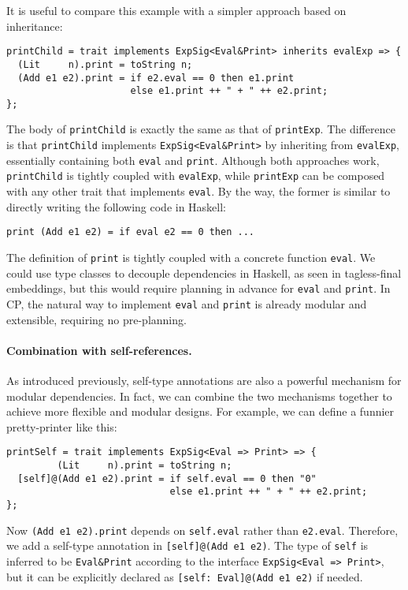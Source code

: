 It is useful to compare this example with a simpler approach based on
inheritance:
\begin{lstlisting}
printChild = trait implements ExpSig<Eval&Print> inherits evalExp => {
  (Lit     n).print = toString n;
  (Add e1 e2).print = if e2.eval == 0 then e1.print
                      else e1.print ++ " + " ++ e2.print;
};
\end{lstlisting}
The body of \lstinline{printChild} is exactly the same as that of
\lstinline{printExp}. The difference is that \lstinline{printChild} implements
\lstinline{ExpSig<Eval&Print>} by inheriting from \lstinline{evalExp},
essentially containing both \lstinline{eval} and \lstinline{print}. Although
both approaches work, \lstinline{printChild} is tightly coupled with
\lstinline{evalExp}, while \lstinline{printExp} can be composed with any other
trait that implements \lstinline{eval}. By the way, the former is similar to
directly writing the following code in Haskell:
\begin{lstlisting}
print (Add e1 e2) = if eval e2 == 0 then ...
\end{lstlisting}
The definition of \lstinline{print} is tightly coupled with a concrete function
\lstinline{eval}. We could use type classes to decouple dependencies in Haskell,
as seen in tagless-final embeddings, but this would require planning in advance
for \lstinline{eval} and \lstinline{print}. In CP, the natural way to implement
\lstinline{eval} and \lstinline{print} is already modular and extensible,
requiring no pre-planning.

\paragraph{Combination with self-references.}
As introduced previously, self-type annotations are also a powerful mechanism
for modular dependencies. In fact, we can combine the two mechanisms together
to achieve more flexible and modular designs. For example, we can define a
funnier pretty-printer like this:
\begin{lstlisting}
printSelf = trait implements ExpSig<Eval => Print> => {
         (Lit     n).print = toString n;
  [self]@(Add e1 e2).print = if self.eval == 0 then "0"
                             else e1.print ++ " + " ++ e2.print;
};
\end{lstlisting}
Now \lstinline{(Add e1 e2).print} depends on \lstinline{self.eval} rather than
\lstinline{e2.eval}. Therefore, we add a self-type annotation in
\lstinline{[self]@(Add e1 e2)}. The type of \lstinline{self} is inferred to be
\lstinline{Eval&Print} according to the interface \lstinline{ExpSig<Eval => Print>},
but it can be explicitly declared as \lstinline{[self: Eval]@(Add e1 e2)} if needed.

